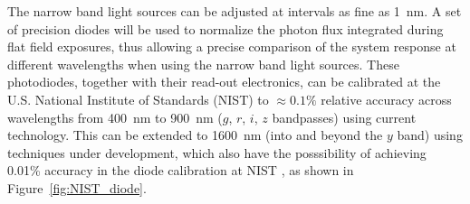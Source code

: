 \documentclass[12pt,preprint]{aastex}
\begin{document}
The narrow band light sources can be adjusted at intervals as fine as
1~nm.  A set of precision diodes will be used to normalize the photon
flux integrated during flat field exposures, thus allowing a precise
comparison of the system response at different wavelengths when using
the narrow band light sources.  These photodiodes, together with their
read-out electronics, can be calibrated at the U.S. National Institute
of Standards (NIST) to $\approx0.1\%$ relative accuracy across
wavelengths from 400~nm to 900~nm ($g$, $r$, $i$, $z$ bandpasses)
using current technology.  This can be extended to 1600~nm (into and
beyond the $y$ band) using techniques under development, which also
have the posssibility of achieving 0.01\% accuracy in the diode
calibration at NIST \citep{Eppeldauer09}, as shown in
Figure~\ref{fig:NIST_diode}.
\end{document}
